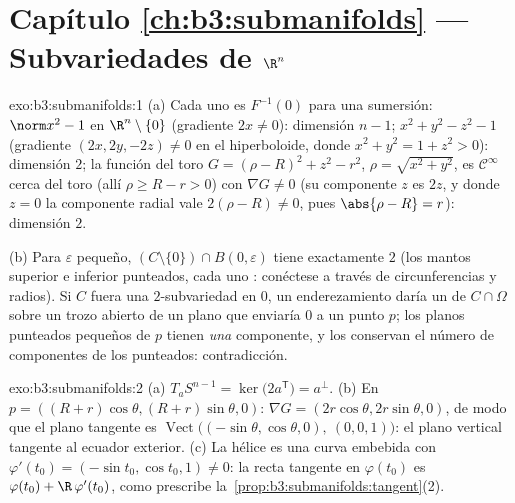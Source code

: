 \section*{Capítulo \ref{ch:b3:submanifolds} --- Subvariedades de
$\R^n$}

\begin{solution}{exo:b3:submanifolds:1}
(a) Cada uno es $F^{-1}(0)$ para una sumersión: $\norm x^2 - 1$ en
$\R^n\setminus\{0\}$ (gradiente $2x \neq 0$): dimensión $n-1$;
$x^2 + y^2 - z^2 - 1$ (gradiente $(2x, 2y, -2z) \neq 0$ en el
hiperboloide, donde $x^2 + y^2 = 1 + z^2 > 0$): dimensión $2$; la
función del toro $G = (\rho - R)^2 + z^2 - r^2$, $\rho =
\sqrt{x^2+y^2}$, es $\mathcal C^\infty$ cerca del toro (allí $\rho
\geq R - r > 0$) con $\nabla G \neq 0$ (su componente $z$ es $2z$, y
donde $z = 0$ la componente radial vale $2(\rho - R)\ne0$, pues
$\abs{\rho - R} = r$): dimensión
$2$.

(b) Para $\varepsilon$ pequeño, $(C\setminus\{0\})\cap B(0,\varepsilon)$
tiene exactamente $2$  (los mantos superior e inferior punteados, cada uno
: conéctese a
través de circunferencias y radios). Si $C$ fuera una $2$-subvariedad en
$0$, un enderezamiento daría un
 de $C\cap\Omega$
sobre un trozo abierto de un plano que enviaría $0$ a un punto $p$; los
 planos punteados pequeños de
$p$ tienen \emph{una} componente, y los
 conservan el número
de componentes de los 
punteados: contradicción.
\end{solution}

\begin{solution}{exo:b3:submanifolds:2}
(a) $T_aS^{n-1} = \ker\bigl(2a^{\mathsf T}\bigr) = a^\perp$.
(b) En $p = ((R+r)\cos\theta, (R+r)\sin\theta, 0)$: $\nabla G
= (2r\cos\theta, 2r\sin\theta, 0)$, de modo que el plano tangente es
$\operatorname{Vect}\bigl((-\sin\theta, \cos\theta, 0),\ (0,
0, 1)\bigr)$: el plano vertical tangente al ecuador exterior. (c) La
hélice es una curva embebida con $\varphi'(t_0) =
(-\sin t_0, \cos t_0, 1) \neq 0$: la recta tangente en $\varphi(t_0)$ es
$\varphi(t_0) + \R\,\varphi'(t_0)$, como prescribe
la~\cref{prop:b3:submanifolds:tangent}(2).
\end{solution}

